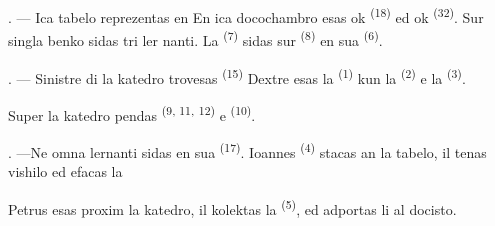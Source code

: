 \begin{VUpage}[7]{}
\VUsaut{2.0mm}
\VUsaut{3.2mm}
\VUsaut{2.6mm}
\VUsaut{3.4mm}
\VUornamento{9pt}
\VUsaut{5.0mm}
\VUsaut{3.0mm}
\VUfilet{16mm}
\VUsaut{5.6mm}

\VUsaut{1.4mm}
\VUsaut{2.2mm}
\VUfilet{20mm}
\VUsaut{6.4mm}

\VUsaut{3.0mm}

. --- Ica tabelo reprezentas \nl
en  En ica docochambro esas ok  \textsuperscript{(18)}\nl
ed ok  \textsuperscript{(32)}. Sur singla benko sidas tri ler\cc
nanti. La  \textsuperscript{(7)} sidas sur  \textsuperscript{(8)} en sua\nl
{} \textsuperscript{(6)}.

. --- Sinistre di la katedro trovesas \cc
{} \textsuperscript{(15)}  Dextre esas la \cc
{} \textsuperscript{(1)} kun la  \textsuperscript{(2)} e la  \textsuperscript{(3)}.

\VUblancAlinea
Super la katedro pendas  \textsuperscript{(9, 11,}\nl
\textsuperscript{12)} e  \textsuperscript{(10)}.

. ---Ne omna lernanti sidas en sua  \textsuperscript{(17)}.\nl
Ioannes \textsuperscript{(4)} stacas an la tabelo, il tenas \nl
vishilo ed efacas la 

\VUblancAlinea
Petrus esas proxim la katedro, il kolektas la\nl
{} \textsuperscript{(5)}, ed adportas li al docisto.
\end{VUpage}

